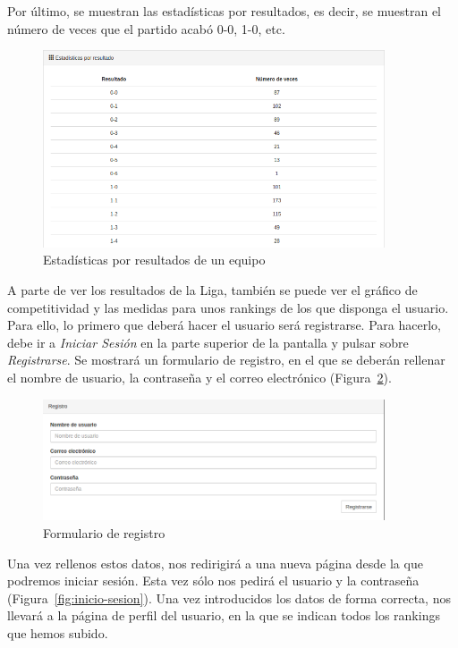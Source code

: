 Por último, se muestran las estadísticas por resultados, es decir, se muestran el número de veces que el partido acabó 0-0, 1-0, etc. \\

\begin{figure}[htb]
\centering
\includegraphics[width=0.9\textwidth]{imagenes/pantallazos-aplicacion/equipo-resultados}
\caption{Estadísticas por resultados de un equipo}
\label{fig:equipo-resultados}
\end{figure}

A parte de ver los resultados de la Liga, también se puede ver el gráfico de competitividad y las medidas para unos rankings de los que disponga el usuario. Para ello, lo primero que deberá hacer el usuario será registrarse. Para hacerlo, debe ir a \emph{Iniciar Sesión} en la parte superior de la pantalla y pulsar sobre \emph{Registrarse}. Se mostrará un formulario de registro, en el que se deberán rellenar el nombre de usuario, la contraseña y el correo electrónico (Figura~\ref{fig:registro}).\\

\begin{figure}[htb]
\centering
\includegraphics[width=0.9\textwidth]{imagenes/pantallazos-aplicacion/registro}
\caption{Formulario de registro}
\label{fig:registro}
\end{figure}

Una vez rellenos estos datos, nos redirigirá a una nueva página desde la que podremos iniciar sesión. Esta vez sólo nos pedirá el usuario y la contraseña (Figura~\ref{fig:inicio-sesion}). Una vez introducidos los datos de forma correcta, nos llevará a la página de perfil del usuario, en la que se indican todos los rankings que hemos subido.

